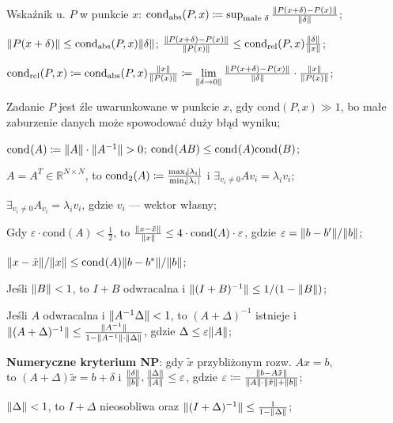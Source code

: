 
\entry
Wskaźnik u. $P$ w punkcie $x$:
$\mathrm{cond}_{\mathrm{abs}}(P,x) \coloneqq \sup_{\text{małe }\delta} \frac{\|P(x+\delta) - P(x)\|}{\|\delta\|}$;

\entry
$\|P(x+\delta)\| \leq \mathrm{cond}_{\mathrm{abs}}(P,x)\|\delta\|$;
\entry
$\frac{\|P(x+\delta) - P(x)\|}{\|P(x)\|} \leq \mathrm{cond}_{\mathrm{rel}}(P,x)\frac{\|\delta\|}{\|x\|}$;


\entry
$
\mathrm{cond}_{\mathrm{rel}}(P,x) \coloneqq
\mathrm{cond}_{\mathrm{abs}}(P,x) \frac{\|x\|}{\|P(x)\|}  \coloneqq
\lim\limits_{\|\delta \to 0\|} \frac{\|P(x+\delta) - P(x)\|}{\|\delta\|} \cdot \frac{\|x\|}{\|P(x)\|}
$;

\entry
Zadanie $P$ jest źle uwarunkowane w punkcie $x$,
gdy $\mathrm{cond}(P,x) \gg 1$,
bo małe zaburzenie danych może spowodować duży błąd wyniku;

\entry
$\cond{A} \coloneqq \norm{\vphantom{A^{-1}}A}\cdot\norm{A^{-1}} > 0$;
\entry
$\mathrm{cond}_{}(AB) \leq \mathrm{cond}_{}(A)\mathrm{cond}_{}(B)$;

\entry
$A=A^T\in\mathbb{R}^{N\times N}$,
to
$\mathrm{cond}_2(A)\coloneqq \frac{\max_i\abs{\lambda_i}}{\min_i\abs{\lambda_i}}$
i
$\exists_{v_i\neq 0} Av_i=\lambda_i v_i$;

\entry
$\exists_{v_i\neq 0} A_{v_i} = \lambda_i v_i$,
gdzie $v_i$ --- wektor własny;

\entry
Gdy
$\varepsilon\cdot\mathrm{cond}(A) < \frac{1}{2}$,
to $\frac{\|x - \tilde{x}\|}{\|x\|} \leq 4 \cdot \mathrm{cond}(A) \cdot \varepsilon$,
gdzie $\varepsilon=\|b-b'\| / \|b\|$;

\entry
$\|x - \tilde{x}\| / \|x\| \leq \mathrm{cond}_{}(A) \|b - b^{*}\| / \|b\|$;

\entry
Jeśli $\|B\| < 1$,
to $I+B$ odwracalna i $\|(I+B)^{-1}\| \leq 1 / (1 - \|B\|)$;

\entry
Jeśli $A$ odwracalna i $\|A^{-1}\Delta\| < 1$,
to $(A+\Delta)^{-1}$ istnieje
i $\|(A+\Delta)^{-1}\| \leq \frac{\|A^{-1}\|}{1 - \|A^{-1}\| \cdot \|\vphantom{A^1}\Delta\|}$,
gdzie $\Delta \leq \varepsilon\|A\|$;

\entry
\textbf{Numeryczne kryterium NP}:
gdy $\tilde{x}$ przybliżonym rozw. $Ax=b$,\\
to $(A+\Delta)\tilde{x}=b+\delta$
i $\frac{\|\delta\|}{\|b\|}, \frac{\|\Delta\|}{\|A\|} \leq \varepsilon$,
gdzie $\varepsilon \coloneqq \frac{\|b-A\tilde{x}\|}{\|A\| \cdot \|\tilde{x}\| + \|b\| }$;


\entry
$\|\Delta\| < 1$,
to $I + \Delta$ nieosobliwa
oraz $\|(I + \Delta)^{-1}\| \leq \frac{1}{1 - \|\Delta\|}$;
